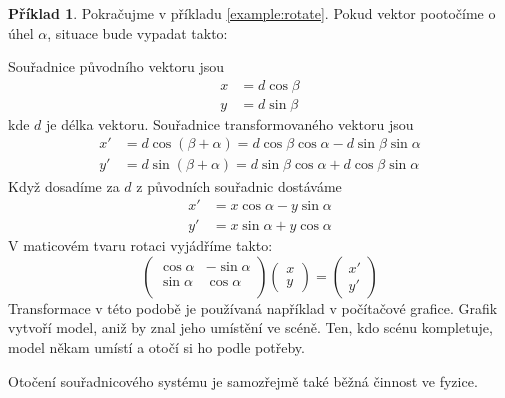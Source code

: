 \documentclass[a5paper,12pt]{amsbook}
\theoremstyle{definition}
\newtheorem{example}{Příklad}[chapter]
\begin{document}
\begin{example}Pokračujme v příkladu \ref{example:rotate}. Pokud vektor pootočíme o úhel $\alpha$,
situace bude vypadat takto:
\begin{center}

\end{center}
Souřadnice původního vektoru jsou
\begin{align*} 
x &= d\cos\beta\\ 
y &= d\sin\beta
\end{align*}
kde $d$ je délka vektoru. Souřadnice transformovaného vektoru jsou
\begin{align*} 
x' &= d\cos(\beta+\alpha) = d\cos\beta\cos\alpha - d\sin\beta\sin\alpha\\ 
y' &= d\sin(\beta+\alpha) = d\sin\beta\cos\alpha + d\cos\beta\sin\alpha
\end{align*}
Když dosadíme za $d$ z původních souřadnic dostáváme
\begin{align*} 
x' &= x\cos\alpha - y\sin\alpha\\ 
y' &= x\sin\alpha + y\cos\alpha
\end{align*}
V maticovém tvaru rotaci vyjádříme takto:
\begin{equation*}
\left(\begin{array}{cc}
\cos\alpha & -\sin\alpha\\
\sin\alpha & \cos\alpha\\
\end{array}\right)\left(\begin{array}{c}
x\\
y
\end{array}\right)=\left(\begin{array}{c}
x'\\
y'
\end{array}\right)
\end{equation*}
Transformace v této podobě je používaná například v počítačové grafice. Grafik
vytvoří model, aniž by znal jeho umístění ve scéně. Ten, kdo scénu kompletuje,
model někam umístí a otočí si ho podle potřeby.

Otočení souřadnicového systému je samozřejmě také běžná činnost ve fyzice.

\end{example}
\end{document}
